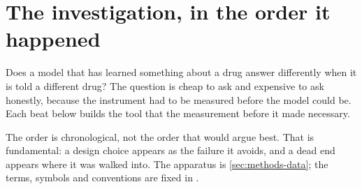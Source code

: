 %
%
%
%
\chapter{The investigation, in the order it happened}
\label{sec:methods}
\label{sec:results}

\begin{question}
Does a model that has learned something about a drug answer differently when it
is told a different drug? The question is cheap to ask and expensive to ask
honestly, because the instrument had to be measured before the model could be.
Each beat below builds the tool that the measurement before it made necessary.
\end{question}

\noindent
The order is chronological, not the order that would argue best. That is
fundamental: a design choice appears as the failure it avoids, and a dead end
appears where it was walked into. The apparatus is \cref{sec:methods-data}; the
terms, symbols and conventions are fixed in .

